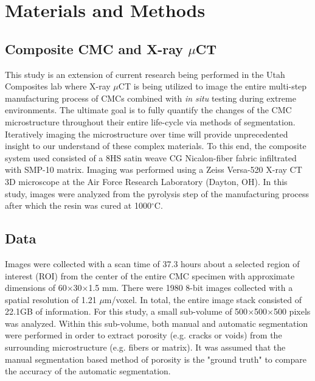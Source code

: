 \documentclass[11pt, twocolumn]{article}
\begin{document}
\section{Materials and Methods}

\subsection{Composite CMC and X-ray $\mu$CT}
This study is an extension of current research being performed in the Utah Composites lab where X-ray $\mu$CT is being utilized to image the entire multi-step manufacturing process of CMCs combined with \textit{in situ} testing during extreme environments. The ultimate goal is to fully quantify the changes of the CMC microstructure throughout their entire life-cycle via methods of segmentation. Iteratively imaging the microstructure over time will provide unprecedented insight to our understand of these complex materials. To this end, the composite system used consisted of a 8HS satin weave CG Nicalon-fiber fabric infiltrated with SMP-10 matrix. Imaging was performed using a Zeiss Versa-520 X-ray CT 3D microscope at the Air Force Research Laboratory (Dayton, OH). In this study, images were analyzed from the pyrolysis step of the manufacturing process after which the resin was cured at 1000$^{\circ}$C.

\subsection{Data}
Images were collected with a scan time of 37.3 hours about a selected region of interest (ROI) from the center of the entire CMC specimen with approximate dimensions of 60$\times$30$\times$1.5 mm. There were 1980 8-bit images collected with a spatial resolution of 1.21 $\mu$m/voxel. In total, the entire image stack consisted of 22.1GB of information. For this study, a small sub-volume of 500$\times$500$\times$500 pixels was analyzed. Within this sub-volume, both manual and automatic segmentation were performed in order to extract porosity (e.g. cracks or voids) from the surrounding microstructure (e.g. fibers or matrix). It was assumed that the manual segmentation based method of porosity is the "ground truth" to compare the accuracy of the automatic segmentation.
\end{document}
